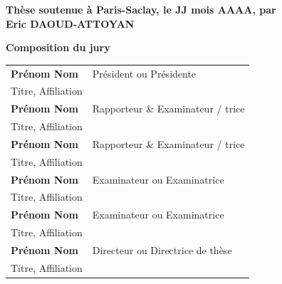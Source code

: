 \documentclass[12pt, a4paper]{book}
\begin{document}
\begin{titlepage}
\textbf{Thèse soutenue à Paris-Saclay, le JJ mois AAAA, par}\\
\bigskip
\Large {\color{Prune} \textbf{Eric DAOUD-ATTOYAN}} %

\vspace{\fill} %

\bigskip

\flushleft
\small \textbf{Composition du jury}\\
\vspace{2mm}
\scriptsize
\begin{tabular}{|p{7cm}l}
\arrayrulecolor{Prune}
\textbf{Prénom Nom} &   Président ou Présidente\\ 
Titre, Affiliation & \\
\textbf{Prénom Nom} &  Rapporteur \& Examinateur / trice \\ 
Titre, Affiliation   &   \\ 
\textbf{Prénom Nom} &  Rapporteur \& Examinateur / trice \\ 
Titre, Affiliation  &   \\ 
\textbf{Prénom Nom} &  Examinateur ou Examinatrice \\ 
Titre, Affiliation   &   \\ 
\textbf{Prénom Nom} &  Examinateur ou Examinatrice \\ 
Titre, Affiliation   &   \\ 
\textbf{Prénom Nom} &  Directeur ou Directrice de thèse \\ 
Titre, Affiliation   &   \\ 

\end{tabular} 

\end{titlepage}



\begin{singlespace}






\end{singlespace}

\Ifthispageodd{\newpage\thispagestyle{empty}\null\newpage}{}
\thispagestyle{empty}
\selectfont
\end{document}
